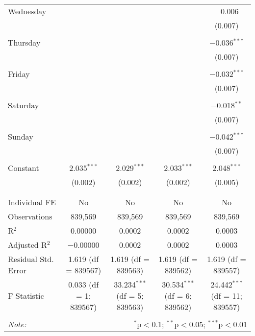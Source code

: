 \documentclass[
]{article}
\begin{document}
\begin{table}[!htbp]
{\begin{tabular}{@{\extracolsep{5pt}}lcccc}
 Wednesday &  &  &  & $-$0.006 \\ 
  &  &  &  & (0.007) \\ 
  & & & & \\ 
 Thursday &  &  &  & $-$0.036$^{***}$ \\ 
  &  &  &  & (0.007) \\ 
  & & & & \\ 
 Friday &  &  &  & $-$0.032$^{***}$ \\ 
  &  &  &  & (0.007) \\ 
  & & & & \\ 
 Saturday &  &  &  & $-$0.018$^{**}$ \\ 
  &  &  &  & (0.007) \\ 
  & & & & \\ 
 Sunday &  &  &  & $-$0.042$^{***}$ \\ 
  &  &  &  & (0.007) \\ 
  & & & & \\ 
 Constant & 2.035$^{***}$ & 2.029$^{***}$ & 2.033$^{***}$ & 2.048$^{***}$ \\ 
  & (0.002) & (0.002) & (0.002) & (0.005) \\ 
  & & & & \\ 
\hline \\[-1.8ex] 
Individual FE & No & No & No & No \\ 
Observations & 839,569 & 839,569 & 839,569 & 839,569 \\ 
R$^{2}$ & 0.00000 & 0.0002 & 0.0002 & 0.0003 \\ 
Adjusted R$^{2}$ & $-$0.00000 & 0.0002 & 0.0002 & 0.0003 \\ 
Residual Std. Error & 1.619 (df = 839567) & 1.619 (df = 839563) & 1.619 (df = 839562) & 1.619 (df = 839557) \\ 
F Statistic & 0.033 (df = 1; 839567) & 33.234$^{***}$ (df = 5; 839563) & 30.534$^{***}$ (df = 6; 839562) & 24.442$^{***}$ (df = 11; 839557) \\ 
\hline 
\hline \\[-1.8ex] 
\textit{Note:}  & \multicolumn{4}{r}{$^{*}$p$<$0.1; $^{**}$p$<$0.05; $^{***}$p$<$0.01} \\ 
\end{tabular}
} 
\end{table} 
\newpage
\end{document}
